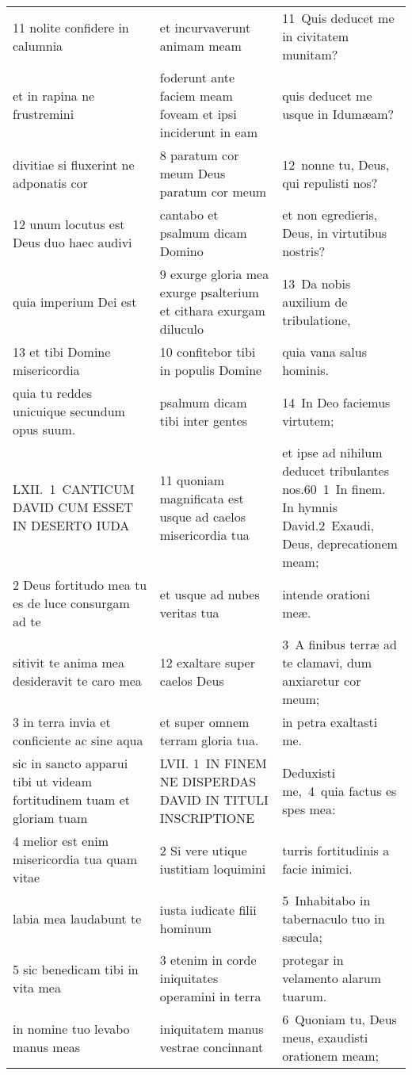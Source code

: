 \documentclass{article}
\begin{document}
\begin{longtable}{@{}p{}p{}p{}@{}}
11 nolite confidere in calumnia	&	et incurvaverunt animam meam	&	11 Quis deducet me in civitatem munitam?	\\
et in rapina ne frustremini	&	foderunt ante faciem meam foveam et ipsi inciderunt in eam	&	quis deducet me usque in Idumæam?	\\
divitiae si fluxerint ne adponatis cor	&	8 paratum cor meum Deus paratum cor meum	&	12 nonne tu, Deus, qui repulisti nos?	\\
12 unum locutus est Deus duo haec audivi	&	cantabo et psalmum dicam Domino	&	et non egredieris, Deus, in virtutibus nostris?	\\
quia imperium Dei est	&	9 exurge gloria mea exurge psalterium et cithara exurgam diluculo	&	13 Da nobis auxilium de tribulatione,	\\
13 et tibi Domine misericordia	&	10 confitebor tibi in populis Domine	&	quia vana salus hominis.	\\
quia tu reddes unicuique secundum opus suum.	&	psalmum dicam tibi inter gentes	&	14 In Deo faciemus virtutem;	\\
LXII. 1 CANTICUM DAVID CUM ESSET IN DESERTO IUDA	&	11 quoniam magnificata est usque ad caelos misericordia tua	&	et ipse ad nihilum deducet tribulantes nos.60 1 In finem. In hymnis David.2 Exaudi, Deus, deprecationem meam;	\\
2 Deus fortitudo mea tu es de luce consurgam ad te	&	et usque ad nubes veritas tua	&	intende orationi meæ.	\\
sitivit te anima mea desideravit te caro mea	&	12 exaltare super caelos Deus	&	3 A finibus terræ ad te clamavi, dum anxiaretur cor meum;	\\
3 in terra invia et conficiente ac sine aqua	&	et super omnem terram gloria tua.	&	in petra exaltasti me.	\\
sic in sancto apparui tibi ut videam fortitudinem tuam et gloriam tuam	&	LVII. 1 IN FINEM NE DISPERDAS DAVID IN TITULI INSCRIPTIONE	&	Deduxisti me, 4 quia factus es spes mea:	\\
4 melior est enim misericordia tua quam vitae	&	2 Si vere utique iustitiam loquimini	&	turris fortitudinis a facie inimici.	\\
labia mea laudabunt te	&	iusta iudicate filii hominum	&	5 Inhabitabo in tabernaculo tuo in sæcula;	\\
5 sic benedicam tibi in vita mea	&	3 etenim in corde iniquitates operamini in terra	&	protegar in velamento alarum tuarum.	\\
in nomine tuo levabo manus meas	&	iniquitatem manus vestrae concinnant	&	6 Quoniam tu, Deus meus, exaudisti orationem meam;	\\

\end{longtable}
\end{document}

